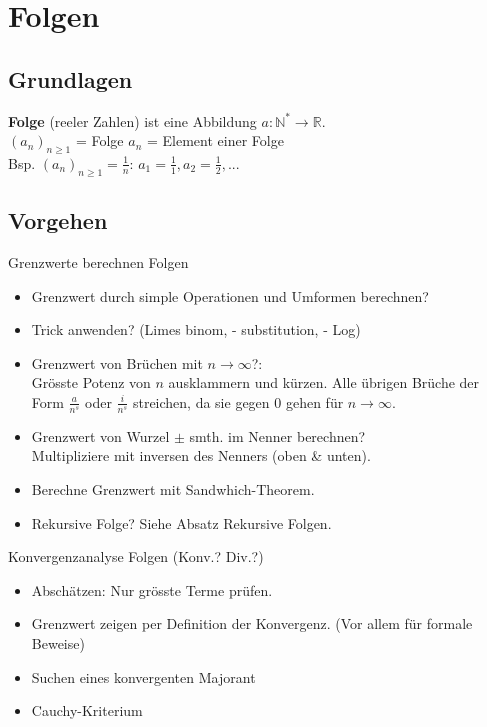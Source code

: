 \documentclass[a4paper]{article}
\newcommand\R{\ensuremath{\mathbb{R}}}
\begin{document}
\section{Folgen}
\subsection{Grundlagen}
\textbf{Folge} (reeler Zahlen) ist eine Abbildung $a: \mathbb{N}^* \longrightarrow \R$. \\
    $(a_n)_{n\geqslant1}$ = Folge \qquad $a_n$ = Element einer Folge \\
    \tiny \color{gray}
      Bsp. $(a_n)_{n\geqslant1} = \frac{1}{n}$: $a_1 = \frac{1}{1}, a_2 = \frac{1}{2}, ...$ \\
    \normalsize \color{black}

\subsection{Vorgehen}
\begin{howtobox}{Grenzwerte berechnen Folgen}
  \begin{itemize}[leftmargin=3mm, topsep=1pt, parsep=1pt]
    \item[1.] Grenzwert durch simple Operationen und Umformen berechnen?
    \item[2.] Trick anwenden? (Limes binom, - substitution, - Log)
    \item[3.] Grenzwert von Brüchen mit $n \to \infty$?:  \\
              Grösste Potenz von $n$ ausklammern und kürzen. Alle übrigen Brüche der Form $\frac{a}{n^s}$ oder $\frac{i}{n^s}$ streichen, da sie gegen 0 gehen für $n \rightarrow \infty$.
    \item[4.] Grenzwert von Wurzel $\pm$ smth. im Nenner berechnen? \\
              Multipliziere mit inversen des Nenners (oben \& unten).
    \item[5.] Berechne Grenzwert mit Sandwhich-Theorem.
    \item[6.] Rekursive Folge? Siehe Absatz Rekursive Folgen.
  \end{itemize}
\end{howtobox}

\begin{howtobox}{Konvergenzanalyse Folgen (Konv.? Div.?)}
  \begin{itemize}[leftmargin=3mm]
    \item[1.] Abschätzen: Nur grösste Terme prüfen. 
    \item[2.] Grenzwert zeigen per Definition der Konvergenz. (Vor allem für formale Beweise)
    \item[3.] Suchen eines konvergenten Majorant
    \item[4.] Cauchy-Kriterium 
  \end{itemize}
\end{howtobox}
\end{document}
